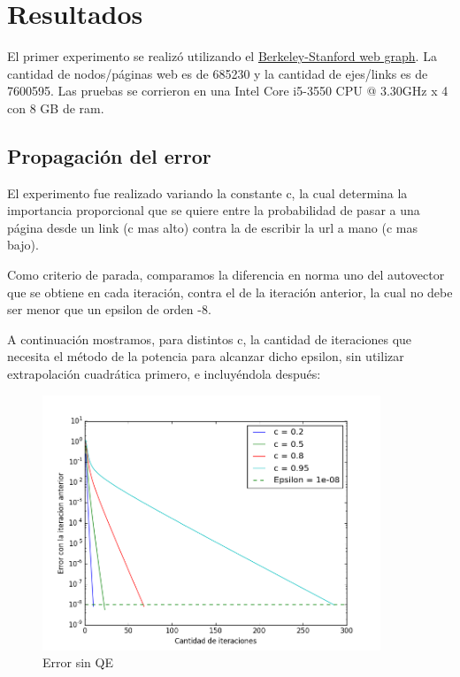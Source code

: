 \section{Resultados}

El primer experimento se realiz\'o utilizando el \href{http://snap.stanford.edu/data/web-BerkStan.html}{Berkeley-Stanford web graph}. La cantidad de nodos/p\'aginas web es de 685230 y la cantidad de ejes/links es de 7600595.
Las pruebas se corrieron en una Intel Core i5-3550 CPU @ 3.30GHz x 4 con 8 GB de ram. 

\subsection{Propagaci\'on del error}

El experimento fue realizado variando la constante c, la cual determina la importancia proporcional que se quiere
entre la probabilidad de pasar a una p\'agina desde un link (c mas alto) contra la de escribir la url a mano (c mas bajo).

Como criterio de parada, comparamos la diferencia en norma uno del autovector que se obtiene
en cada iteraci\'on, contra el de la iteraci\'on anterior, la cual no debe ser menor que un
epsilon de orden -8.

A continuación mostramos, para distintos c, la cantidad de iteraciones que necesita el método de la potencia para alcanzar dicho epsilon, sin utilizar extrapolaci\'on cuadr\'atica primero, e incluy\'endola despu\'es:

\begin{figure}[H]
  \centering
    \includegraphics[width=0.9\textwidth]{errorSinQE.png}
    \caption{Error sin QE}
    \label{}
\end{figure}

